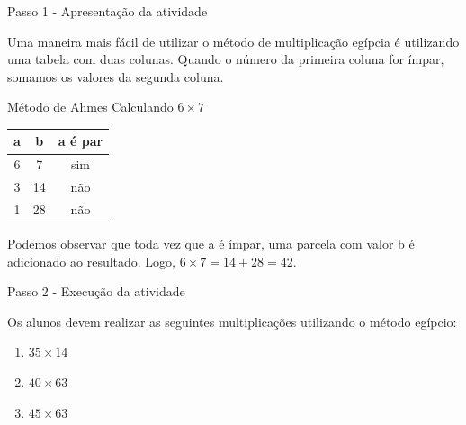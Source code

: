 \documentclass{beamer}
\begin{document}
\begin{frame}{Passo 1 - Apresentação da atividade}

Uma maneira mais fácil de utilizar o método de multiplicação egípcia é utilizando uma tabela com duas colunas. Quando o número da primeira coluna for ímpar, somamos os valores da segunda coluna.

    \begin{block}{Método de Ahmes}
    Calculando $6 \times 7$
    
    \begin{center}
    \begin{tabular}{c|c|c}
    a & b & a é par\\
    \hline
    6 & 7 & sim\\
    3 & 14 & não\\
    1 & 28 & não\\
    \end{tabular}
    \end{center}
    
    Podemos observar que toda vez que a é ímpar, uma parcela com valor b é adicionado ao resultado. Logo, $6 \times 7 = 14 + 28 = 42.$
    
    \end{block}
\end{frame}




\begin{frame}{Passo 2 - Execução da atividade}

Os alunos devem realizar as seguintes multiplicações utilizando o método egípcio:

\begin{enumerate}
    \item $35  \times 14$
    \item $40  \times 63$
    \item $45  \times 63$
\end{enumerate}





\end{frame}
\end{document}
